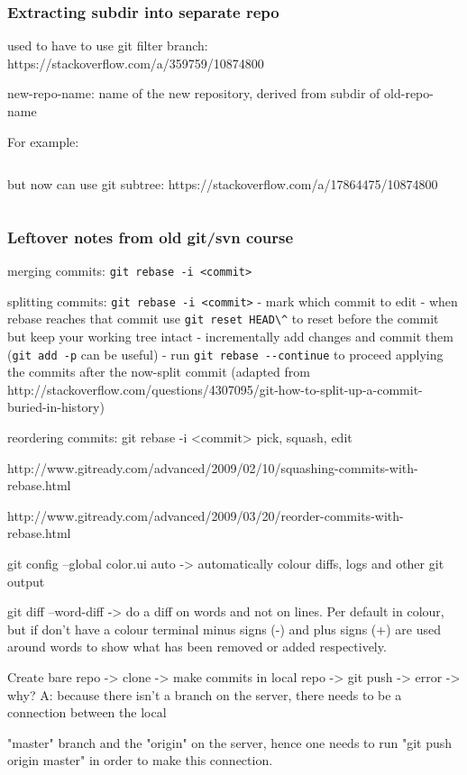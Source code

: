 \documentclass{git_course}
\begin{document}
\begin{frame}[fragile]
\frametitle{Extracting subdir into separate repo}
used to have to use git filter branch:
    https://stackoverflow.com/a/359759/10874800

    new-repo-name: name of the new repository, derived from subdir of
    old-repo-name

For example:

    \inputminted{bash}{extract-subdir-into-own-repo-with-filter-branch.txt}

but now can use git subtree:
    https://stackoverflow.com/a/17864475/10874800

    \inputminted{bash}{extract-subdir-into-own-repo-with-git-subtree.txt}
\end{frame}

\begin{frame}
\frametitle{Leftover notes from old git/svn course}
merging commits: \Verb|git rebase -i <commit>|

splitting commits: \Verb|git rebase -i <commit>|
    - mark which commit to edit
    - when rebase reaches that commit use \Verb|git reset HEAD\^| to reset before the commit but keep your
working tree intact
    - incrementally add changes and commit them (\Verb|git add -p| can be useful)
    - run \Verb|git rebase --continue| to proceed applying the commits after the now-split commit
(adapted from http://stackoverflow.com/questions/4307095/git-how-to-split-up-a-commit-buried-in-history)

reordering commits: git rebase -i <commit>
pick, squash, edit

http://www.gitready.com/advanced/2009/02/10/squashing-commits-with-rebase.html

http://www.gitready.com/advanced/2009/03/20/reorder-commits-with-rebase.html

git config --global color.ui auto -> automatically colour diffs,
logs and other git output

git diff --word-diff -> do a diff on words and not on lines. Per
default in colour, but if don’t have a colour terminal minus
signs (-) and plus signs (+) are used around words to show
what has been removed or added respectively.

Create bare repo -> clone -> make commits in local repo -> git
push -> error -> why? A: because there isn’t a branch on the
server, there needs to be a connection between the local

"master" branch and the "origin" on the server, hence one
needs to run "git push origin master" in order to make this
connection.
\end{frame}
\end{document}
